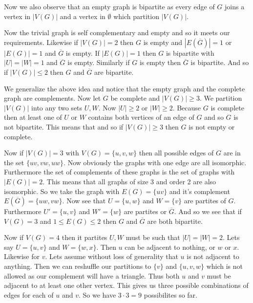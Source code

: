 \documentclass[letterpaper]{article}
\begin{document}
\begin{enumerate}
\begin{enumerate}
  Now we also observe that an empty graph is bipartite as every edge of $G$ joins a vertex in $|V(G)|$ and a vertex in $\emptyset$ which partition $|V(G)|$.

  Now the trivial graph is self complementary and empty and so it meets our requirements. Likewise if $|V(G)|=2$ then $G$ is empty and $|E(\overline{G})|=1$ or $|E(G)|=1$ and $\overline{G}$ is empty. If $|E(G)|=1$ then $G$ is bipartite with $|U|=|W|=1$ and $\overline{G}$ is empty. Similarly if $G$ is empty then $\overline{G}$ is bipartite. And so if $|V(G)|\le 2$ then $G$ and $\overline{G}$ are bipartite.

  We generalize the above idea and notice that the empty graph and the complete graph are complements. Now let $G$ be complete and $|V(G)|\ge 3$. We partition $|V(G)|$ into any two sets $U,W$. Now $|U|\ge 2$ or $|W|\ge 2$. Because $G$ is complete then at least one of $U$ or $W$ contains both vertices of an edge of $G$ and so $G$ is not bipartite. This means that and so if $|V(G)|\ge 3$ then $G$ is not empty or complete.

  Now if $|V(G)|=3$ with $V(G)=\{u,v,w\}$ then all possible edges of $G$ are in the set $\{uv,vw,uw\}$. Now obviously the graphs with one edge are all isomorphic. Furthermore the set of complements of these graphs is the set of graphs with $|E(G)|=2$. This means that all graphs of size 3 and order 2 are also isomorphic. So we take the graph with $E(G)=\{uv\}$ and it's complement $E(\overline{G})=\{uw,vw\}$. Now see that $U=\{u,w\}$ and $W=\{v\}$ are partites of $G$. Furthermore $U'=\{u,v\}$ and $W'=\{w\}$ are partites or $\overline{G}$. And so we see that if $V(G)=3$ and  $1\le E(G)\le 2$ then $G$ and $\overline{G}$ are both bipartite.

  Now if $V(G)=4$ then it partites $U,W$ must be such that $|U|=|W|=2$. Lets say $U=\{u,v\}$ and $W=\{w,x\}$. Then $u$ can be adjacent to nothing, or $w$ or $x$. Likewise for $v$. Lets assume without loss of generality that $u$ is not adjacent to anything. Then we can reshuffle our partitions to $\{v\}$ and $\{u,v,w\}$ which is not allowed as our complement will have a triangle. Thus both $u$ and $v$ must be adjacent to at least one other vertex. This gives us three possible combinations of edges for each of $u$ and $v$. So we have $3\cdot3=9$ possibilites so far.


\end{enumerate}
\end{enumerate}
\end{document}
